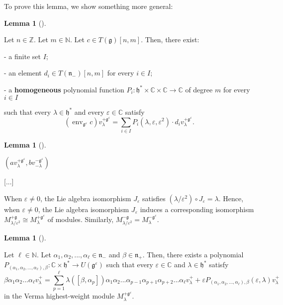 \documentclass
[numbers=enddot,12pt,final,onecolumn,german,notitlepage]{scrartcl}%
\theoremstyle{definition}
\newtheorem{lem}[theo]{Lemma}
\newenvironment{lemma}[1][]
{\begin{lem}[#1]\begin{leftbar}}
{\end{leftbar}\end{lem}}
\begin{document}
To prove this lemma, we show something more general:

\begin{lemma}
\label{lem.invformnondeg.polynomiality2}Let $n\in\mathbb{Z}$. Let
$m\in\mathbb{N}$. Let $c\in T\left(  \mathfrak{g}\right)  \left[  n,m\right]
$. Then, there exist:

- a finite set $I$;

- an element $d_{i}\in T\left(  \mathfrak{n}_{-}\right)  \left[  n,m\right]  $
for every $i\in I$;

- a \textbf{homogeneous} polynomial function $P_{i}:\mathfrak{h}^{\ast}%
\times\mathbb{C}\times\mathbb{C}\rightarrow\mathbb{C}$ of degree $m$ for every
$i\in I$

such that every $\lambda\in\mathfrak{h}^{\ast}$ and every $\varepsilon
\in\mathbb{C}$ satisfy%
\[
\left(  \operatorname*{env}\nolimits_{\mathfrak{g}^{\varepsilon}}c\right)
v_{\lambda}^{+\mathfrak{g}^{\varepsilon}}=\sum\limits_{i\in I}P_{i}\left(
\lambda,\varepsilon,\varepsilon^{2}\right)  \cdot d_{i}v_{\lambda
}^{+\mathfrak{g}^{\varepsilon}}.
\]

\end{lemma}

\begin{lemma}
$\left(  av_{\lambda}^{+\mathfrak{g}^{\varepsilon}},bv_{-\lambda
}^{-\mathfrak{g}^{\varepsilon}}\right)  $
\end{lemma}

[...]

When $\varepsilon\neq0$, the Lie algebra isomorphism $J_{\varepsilon}$
satisfies $\left(  \lambda/\varepsilon^{2}\right)  \circ J_{\varepsilon
}=\lambda$. Hence, when $\varepsilon\neq0$, the Lie algebra isomorphism
$J_{\varepsilon}$ induces a corresponding isomorphism $M_{\lambda
/\varepsilon^{2}}^{+\mathfrak{g}}\cong M_{\lambda}^{+\mathfrak{g}%
^{\varepsilon}}$ of modules. Similarly, $M_{\lambda/\varepsilon^{2}%
}^{-\mathfrak{g}}=M_{\lambda}^{-\mathfrak{g}^{\varepsilon}}$.

\begin{lemma}
\label{lem.invformnondeg.form1}Let $\ell\in\mathbb{N}$. Let $\alpha_{1}%
,\alpha_{2},...,\alpha_{\ell}\in\mathfrak{n}_{-}$ and $\beta\in\mathfrak{n}%
_{+}$. Then, there exists a polynomial $P_{\left(  \alpha_{1},\alpha
_{2},...,\alpha_{\ell}\right)  ,\beta}:\mathbb{C}\times\mathfrak{h}^{\ast
}\rightarrow U\left(  \mathfrak{g}^{\varepsilon}\right)  $ such that every
$\varepsilon\in\mathbb{C}$ and $\lambda\in\mathfrak{h}^{\ast}$ satisfy%
\[
\beta\alpha_{1}\alpha_{2}...\alpha_{\ell}v_{\lambda}^{+}=\sum\limits_{p=1}%
^{\ell}\lambda\left(  \left[  \beta,\alpha_{p}\right]  \right)  \alpha
_{1}\alpha_{2}...\alpha_{p-1}\alpha_{p+1}\alpha_{p+2}...\alpha_{\ell
}v_{\lambda}^{+}+\varepsilon P_{\left(  \alpha_{1},\alpha_{2},...,\alpha
_{\ell}\right)  ,\beta}\left(  \varepsilon,\lambda\right)  v_{\lambda}^{+}%
\]
in the Verma highest-weight module $M_{\lambda}^{+\mathfrak{g}^{\varepsilon}}$.
\end{lemma}
\end{document}
